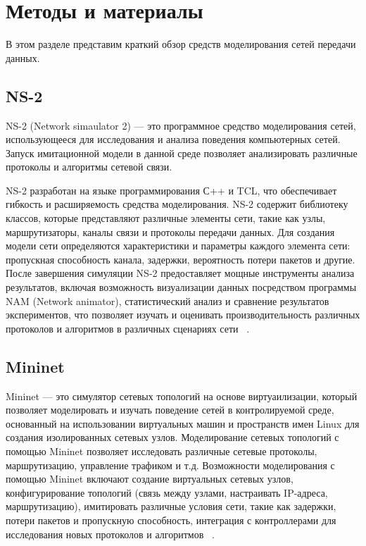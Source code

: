
\chapter{Методы и материалы}
\label{chap1}


В этом разделе представим краткий обзор средств моделирования сетей
передачи данных.

\section{NS-2}
\label{chap1:sec1}

NS-2 (Network simaulator 2) — это программное средство моделирования
сетей, использующееся для исследования и анализа поведения
компьютерных сетей.  Запуск имитационной модели в данной среде
позволяет анализировать различные протоколы и алгоритмы сетевой связи.

NS-2 разработан на языке программирования С++ и TCL, что обеспечивает
гибкость и расширяемость средства моделирования.  NS-2 содержит
библиотеку классов, которые представляют различные элементы сети,
такие как узлы, маршрутизаторы, каналы связи и протоколы передачи
данных. Для создания модели сети определяются характеристики и
параметры каждого элемента сети: пропускная способность канала,
задержки, вероятность потери пакетов и другие. После завершения
симуляции NS-2 предоставляет мощные инструменты анализа результатов,
включая возможность визуализации данных посредством программы NAM
(Network animator), статистический анализ и сравнение результатов
экспериментов, что позволяет изучать и оценивать производительность
различных протоколов и алгоритмов в различных сценариях
сети ~\cite{NS2-1, NS2-2}.

\section{Mininet}
\label{chap1:sec2}

Mininet — это симулятор сетевых топологий на основе виртуаилизации,
который позволяет моделировать и изучать поведение сетей в
контролируемой среде, основанный на использовании виртуальных машин и
пространств имен Linux для создания изолированных сетевых
узлов. Моделирование сетевых топологий с помощью Mininet позволяет
исследовать различные сетевые протоколы, маршрутизацию, управление
трафиком и т.д. Возможности моделирования с помощью Mininet включают
создание виртуальных сетевых узлов, конфигурирование топологий (связь
между узлами, настраивать IP-адреса, маршрутизацию), имитировать
различные условия сети, такие как задержки, потери пакетов и
пропускную способность, интеграция с контроллерами для исследования
новых протоколов и алгоритмов ~\cite{mininet}. 

